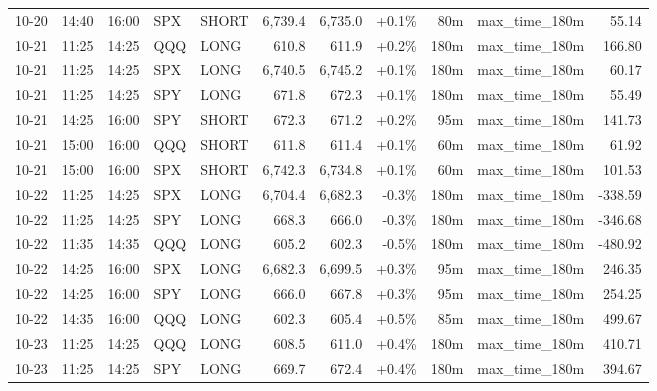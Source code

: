 \documentclass[11pt,a4paper,twoside]{article}
\begin{document}
\begin{center}
\begin{longtable}{>{\color{txtmain}}l l l l l r r r r >{\color{txtmain}}l r}
10-20 & 14:40 & 16:00 & SPX & SHORT & 6,739.4 & 6,735.0 & \textcolor{wingreen}{+0.1\%} & 80m & max\_time\_180m & \textcolor{wingreen}{55.14} \\
10-21 & 11:25 & 14:25 & QQQ & LONG & 610.8 & 611.9 & \textcolor{wingreen}{+0.2\%} & 180m & max\_time\_180m & \textcolor{wingreen}{166.80} \\
10-21 & 11:25 & 14:25 & SPX & LONG & 6,740.5 & 6,745.2 & \textcolor{wingreen}{+0.1\%} & 180m & max\_time\_180m & \textcolor{wingreen}{60.17} \\
10-21 & 11:25 & 14:25 & SPY & LONG & 671.8 & 672.3 & \textcolor{wingreen}{+0.1\%} & 180m & max\_time\_180m & \textcolor{wingreen}{55.49} \\
10-21 & 14:25 & 16:00 & SPY & SHORT & 672.3 & 671.2 & \textcolor{wingreen}{+0.2\%} & 95m & max\_time\_180m & \textcolor{wingreen}{141.73} \\
10-21 & 15:00 & 16:00 & QQQ & SHORT & 611.8 & 611.4 & \textcolor{wingreen}{+0.1\%} & 60m & max\_time\_180m & \textcolor{wingreen}{61.92} \\
10-21 & 15:00 & 16:00 & SPX & SHORT & 6,742.3 & 6,734.8 & \textcolor{wingreen}{+0.1\%} & 60m & max\_time\_180m & \textcolor{wingreen}{101.53} \\
10-22 & 11:25 & 14:25 & SPX & LONG & 6,704.4 & 6,682.3 & \textcolor{lossred}{-0.3\%} & 180m & max\_time\_180m & \textcolor{lossred}{-338.59} \\
10-22 & 11:25 & 14:25 & SPY & LONG & 668.3 & 666.0 & \textcolor{lossred}{-0.3\%} & 180m & max\_time\_180m & \textcolor{lossred}{-346.68} \\
10-22 & 11:35 & 14:35 & QQQ & LONG & 605.2 & 602.3 & \textcolor{lossred}{-0.5\%} & 180m & max\_time\_180m & \textcolor{lossred}{-480.92} \\
10-22 & 14:25 & 16:00 & SPX & LONG & 6,682.3 & 6,699.5 & \textcolor{wingreen}{+0.3\%} & 95m & max\_time\_180m & \textcolor{wingreen}{246.35} \\
10-22 & 14:25 & 16:00 & SPY & LONG & 666.0 & 667.8 & \textcolor{wingreen}{+0.3\%} & 95m & max\_time\_180m & \textcolor{wingreen}{254.25} \\
10-22 & 14:35 & 16:00 & QQQ & LONG & 602.3 & 605.4 & \textcolor{wingreen}{+0.5\%} & 85m & max\_time\_180m & \textcolor{wingreen}{499.67} \\
10-23 & 11:25 & 14:25 & QQQ & LONG & 608.5 & 611.0 & \textcolor{wingreen}{+0.4\%} & 180m & max\_time\_180m & \textcolor{wingreen}{410.71} \\
10-23 & 11:25 & 14:25 & SPY & LONG & 669.7 & 672.4 & \textcolor{wingreen}{+0.4\%} & 180m & max\_time\_180m & \textcolor{wingreen}{394.67} \\

\end{longtable}
\end{center}
\end{document}
